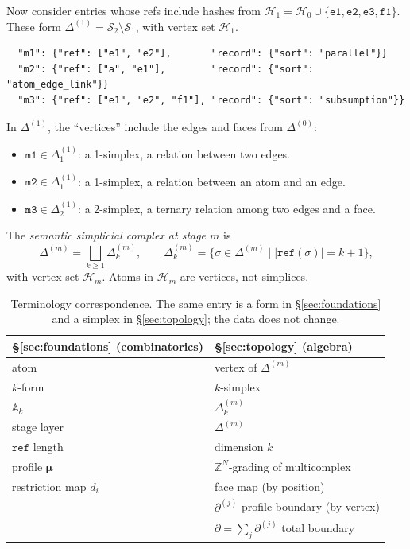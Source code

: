 \begin{example}
\label{ex:delta1}
Now consider entries whose refs include hashes from $\mathcal{H}_1 = \mathcal{H}_0 \cup \{\texttt{e1}, \texttt{e2}, \texttt{e3}, \texttt{f1}\}$. These form $\Delta^{(1)} = \mathcal{S}_2 \setminus \mathcal{S}_1$, with vertex set $\mathcal{H}_1$.
\begin{verbatim}
  "m1": {"ref": ["e1", "e2"],       "record": {"sort": "parallel"}}
  "m2": {"ref": ["a", "e1"],        "record": {"sort": "atom_edge_link"}}
  "m3": {"ref": ["e1", "e2", "f1"], "record": {"sort": "subsumption"}}
\end{verbatim}
In $\Delta^{(1)}$, the ``vertices'' include the edges and faces from $\Delta^{(0)}$:
\begin{itemize}
\item $\texttt{m1} \in \Delta^{(1)}_1$: a 1-simplex, a relation between two edges.
\item $\texttt{m2} \in \Delta^{(1)}_1$: a 1-simplex, a relation between an atom and an edge.
\item $\texttt{m3} \in \Delta^{(1)}_2$: a 2-simplex, a ternary relation among two edges and a face.
\end{itemize}
\end{example}

\begin{definition}
\label{def:semantic-complex}
The \emph{semantic simplicial complex at stage $m$} is
\[
\Delta^{(m)} = \bigsqcup_{k \geq 1} \Delta^{(m)}_k, \qquad \Delta^{(m)}_k = \bigl\{\sigma \in \Delta^{(m)} \;\big|\; |\texttt{ref}(\sigma)| = k+1\bigr\},
\]
with vertex set $\mathcal{H}_m$. Atoms in $\mathcal{H}_m$ are vertices, not simplices.
\end{definition}

\begin{table}[H]
\centering
\small
\begin{tabular}{ll}
\hline
\textbf{\S\ref{sec:foundations} (combinatorics)} & \textbf{\S\ref{sec:topology} (algebra)} \\
\hline
atom & vertex of $\Delta^{(m)}$ \\
$k$-form & $k$-simplex \\
$\mathbb{A}_k$ & $\Delta^{(m)}_k$ \\
stage layer & $\Delta^{(m)}$ \\
$\texttt{ref}$ length & dimension $k$ \\
profile $\boldsymbol{\mu}$ & $\mathbb{Z}^N$-grading of multicomplex \\
restriction map $d_i$ & face map (by position) \\
& $\partial^{(j)}$ profile boundary (by vertex) \\
& $\partial = \sum_j \partial^{(j)}$ total boundary \\
\hline
\end{tabular}
\caption{Terminology correspondence. The same entry is a form in \S\ref{sec:foundations} and a simplex in \S\ref{sec:topology}; the data does not change.}
\label{tab:form-simplex}
\end{table}

